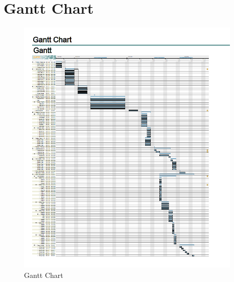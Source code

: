 \documentclass[12pt, titlepage]{article}
\begin{document}
\section{Gantt Chart}
\begin{figure}[H]
\centering
\includegraphics[width=0.95\textwidth]{GanttChartScreenShot.png}
\caption{Gantt Chart}
\label{FigUH}
\end{figure}
\end{document}
